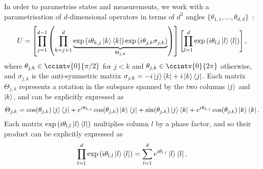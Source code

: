 \documentclass[10pt, a4paper]{article}
\numberwithin{equation}{section} %
\theoremstyle{definition}
\theoremstyle{plain}
\newcommand{\?}{\mathrel{?}} %
\begin{document}
                        In order to parametrise states and measurements, we work with a parametrisation of \(d\)-dimensional operators in terms of \(d^2\) angles \(\{\theta_{1,1},\ldots,\theta_{d,d}\}\)~\cite{CompositeParam}:
                        \begin{equation}
                          U = \left[ \prod_{j=1}^{d-1} \left(\prod_{k={j+1}}^d \underbrace{\exp\left(i\theta_{k,j}\ket{k}\bra{k}\right)\exp\left(i\theta_{j,k}\sigma_{j,k}\right)}_{\Theta_{j,k}} \right) \right] \left[ \prod_{l=1}^d \exp\left(i\theta_{l,l}\ket{l}\bra{l}\right) \right],
                        \end{equation}
                        where \(\theta_{j,k} \in \ccintv{0}{\pi/2}\) for \(j<k\) and \(\theta_{j,k} \in \ccintv{0}{2\pi}\) otherwise, and \(\sigma_{j,k}\) is the anti-symmetric matrix \(\sigma_{j,k} = -i\ket{j}\bra{k} +i\ket{k}\bra{j}\). Each matrix \(\Theta_{j,k}\) represents a rotation in the subspace spanned by the two columns \(\ket{j}\) and \(\ket{k}\), and can be explicitly expressed as
                        \begin{equation}
                          \Theta_{j,k} = \cos(\theta_{j,k})\ket{j}\bra{j} + e^{i\theta_{k,j}}\cos(\theta_{j,k})\ket{k}\bra{j} + \sin(\theta_{j,k})\ket{j}\bra{k} + e^{i\theta_{k,j}}\cos(\theta_{j,k})\ket{k}\bra{k}.
                        \end{equation}
                        Each matrix \(\exp\left(i\theta_{l,l}\ket{l}\bra{l}\right)\) multiplies column \(l\) by a phase factor, and so their product can be explicitly expressed as
                        \begin{equation}
                          \prod_{l=1}^d \exp\left(i\theta_{l,l}\ket{l}\bra{l}\right) = \sum_{l=1}^d e^{i\theta_{l,l}}\ket{l}\bra{l}.
                        \end{equation}
\end{document}
